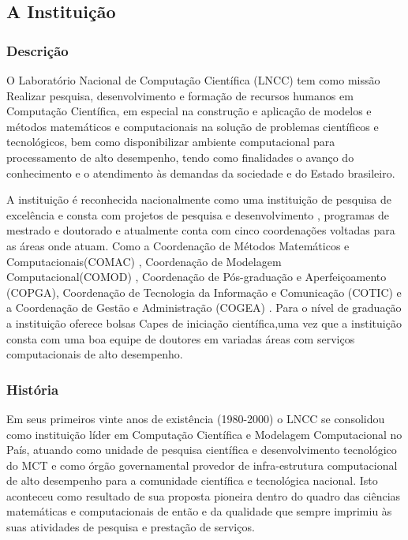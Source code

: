\documentclass[11pt,a4paper]{article}
\begin{document}
\subsection{A Instituição}
\subsubsection{Descrição}
\hspace{1.5cm} O Laboratório Nacional de Computação Científica (LNCC) tem como missão  Realizar pesquisa, desenvolvimento e formação de recursos humanos em Computação Científica, em especial na construção e aplicação de modelos e métodos matemáticos e computacionais na solução de problemas científicos e tecnológicos, bem como disponibilizar ambiente computacional para processamento de alto desempenho, tendo como finalidades o avanço do conhecimento e o atendimento às demandas da sociedade e do Estado brasileiro.

A instituição é reconhecida nacionalmente como uma instituição de pesquisa de excelência e consta com projetos de pesquisa e desenvolvimento , programas de mestrado e doutorado e atualmente conta com cinco coordenações voltadas para as áreas onde atuam. Como a Coordenação de Métodos Matemáticos e Computacionais(COMAC) , Coordenação de Modelagem Computacional(COMOD) , Coordenação de Pós-graduação e Aperfeiçoamento (COPGA), Coordenação de Tecnologia da Informação e Comunicação (COTIC) e a Coordenação de Gestão e Administração (COGEA) . Para o nível de graduação a instituição oferece bolsas Capes de iniciação científica,uma vez que a instituição consta com uma boa equipe de doutores em variadas áreas com serviços computacionais de alto desempenho.
\subsubsection{História}
\hspace{1.5cm}Em seus primeiros vinte anos de existência (1980-2000) o LNCC se consolidou como instituição líder em Computação Científica e Modelagem Computacional no País, atuando como unidade de pesquisa científica e desenvolvimento tecnológico do MCT e como órgão governamental provedor de infra-estrutura computacional de alto desempenho para a comunidade científica e tecnológica nacional. Isto aconteceu como resultado de sua proposta pioneira dentro do quadro das ciências matemáticas e computacionais de então e da qualidade que sempre imprimiu às suas atividades de pesquisa e prestação de serviços.
\end{document}

